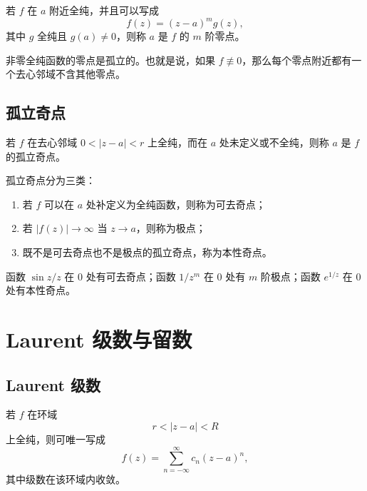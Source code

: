 \begin{definition}[$m$ 阶零点]
若 $f$ 在 $a$ 附近全纯，并且可以写成
\[
    f(z)=(z-a)^m g(z),
\]
其中 $g$ 全纯且 $g(a)\ne0$，则称 $a$ 是 $f$ 的 $m$ 阶零点。
\end{definition}

\begin{proposition}
非零全纯函数的零点是孤立的。也就是说，如果 $f\not\equiv0$，那么每个零点附近都有一个去心邻域不含其他零点。
\end{proposition}

\subsection{孤立奇点}

\begin{definition}[孤立奇点]
若 $f$ 在去心邻域 $0<|z-a|<r$ 上全纯，而在 $a$ 处未定义或不全纯，则称 $a$ 是 $f$ 的孤立奇点。
\end{definition}

\begin{definition}[孤立奇点的类型]
孤立奇点分为三类：
\begin{enumerate}
    \item 若 $f$ 可以在 $a$ 处补定义为全纯函数，则称为可去奇点；
    \item 若 $|f(z)|\to\infty$ 当 $z\to a$，则称为极点；
    \item 既不是可去奇点也不是极点的孤立奇点，称为本性奇点。
\end{enumerate}
\end{definition}

\begin{example}
函数 $\sin z/z$ 在 $0$ 处有可去奇点；函数 $1/z^m$ 在 $0$ 处有 $m$ 阶极点；函数 $e^{1/z}$ 在 $0$ 处有本性奇点。
\end{example}

\section{Laurent 级数与留数}

\subsection{Laurent 级数}

\begin{theorem}[Laurent 展开]
若 $f$ 在环域
\[
    r<|z-a|<R
\]
上全纯，则可唯一写成
\[
    f(z)=\sum_{n=-\infty}^{\infty}c_n(z-a)^n,
\]
其中级数在该环域内收敛。
\end{theorem}

